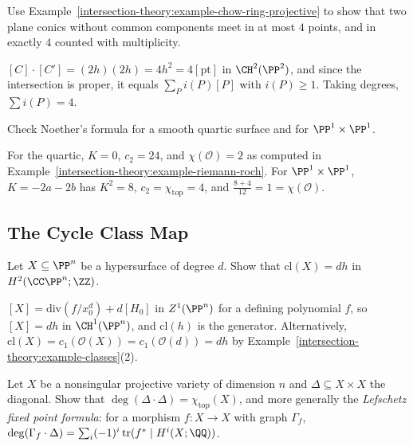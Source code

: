 \begin{exercise}\label{intersection-theory:exercise-bezout-conics}
Use Example~\ref{intersection-theory:example-chow-ring-projective} to show that two plane conics without common components meet in at most $4$ points, and in exactly $4$ counted with
multiplicity.
\end{exercise}

\begin{solution}
$[C] \cdot [C'] = (2h)(2h) = 4h^2 = 4[\mathrm{pt}]$ in $\CH^2(\PP^2)$, and since the intersection is proper, it equals $\sum_Pi(P)[P]$ with $i(P) \geq 1$. Taking degrees, $\sum i(P) = 4$.
\end{solution}

\begin{exercise}\label{intersection-theory:exercise-noether-quartic}
Check Noether's formula for a smooth quartic surface and for $\PP^1 \times \PP^1$.
\end{exercise}

\begin{solution}
For the quartic, $K = 0$, $c_2 = 24$, and $\chi(\mathcal{O}) = 2$ as computed in Example~\ref{intersection-theory:example-riemann-roch}. For $\PP^1 \times \PP^1$, $K = -2a - 2b$ has
$K^2 = 8$, $c_2 = \chi_{\mathrm{top}} = 4$, and $\frac{8 + 4}{12} = 1 = \chi(\mathcal{O})$.
\end{solution}

\subsection{The Cycle Class Map}\label{intersection-theory:subsection-exercises-cycle-class}

\begin{exercise}\label{intersection-theory:exercise-hypersurface-class}
Let $X \subseteq \PP^n$ be a hypersurface of degree $d$. Show that $\mathrm{cl}(X) = dh$ in $H^2(\CC\PP^n; \ZZ)$.
\end{exercise}

\begin{solution}
$[X] = \mathrm{div}(f/x_0^d) + d[H_0]$ in $Z^1(\PP^n)$ for a defining polynomial $f$, so $[X] = dh$ in $\CH^1(\PP^n)$, and $\mathrm{cl}(h)$ is the generator. Alternatively,
$\mathrm{cl}(X) = c_1(\mathcal{O}(X)) = c_1(\mathcal{O}(d)) = dh$ by Example~\ref{intersection-theory:example-classes}(2).
\end{solution}

\begin{exercise}\label{intersection-theory:exercise-diagonal}
Let $X$ be a nonsingular projective variety of dimension $n$ and $\Delta \subseteq X \times X$ the diagonal. Show that $\deg(\Delta \cdot \Delta) = \chi_{\mathrm{top}}(X)$, and more generally
the \emph{Lefschetz fixed point formula}: for a morphism $f \colon X \to X$ with graph $\Gamma_f$, $\deg(\Gamma_f \cdot \Delta) = \sum_i(-1)^i\operatorname{tr}(f^* \mid H^i(X; \QQ))$.
\end{exercise}

